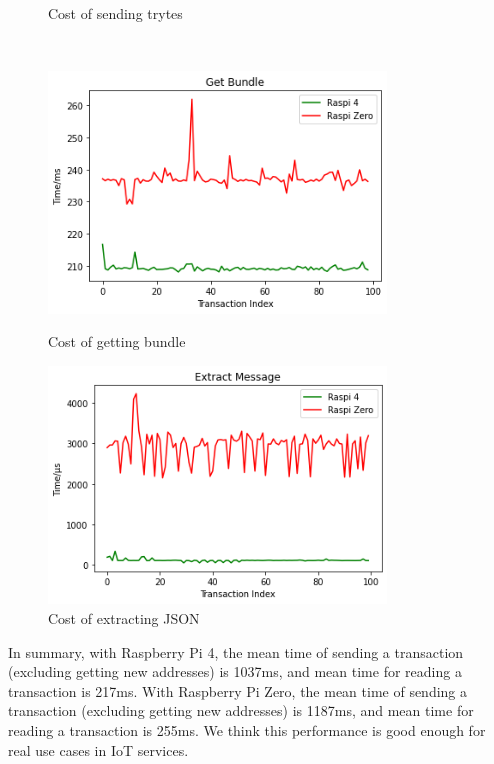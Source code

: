 \begin{figure}[t]
\begin{minipage}[t]{0.45\linewidth}
    \caption{Cost of sending trytes}
    \label{fig:cost_sending_trytes}
\end{minipage}		
\\ [1ex]
\begin{minipage}[t]{0.45\linewidth}
    \centering
    \includegraphics[width=0.8\textwidth]{figs/get_bundle_0.png}
    \caption{Cost of getting bundle}
    \label{fig:cost_getting_bundle}
    \end{minipage}
    \hfill
\begin{minipage}[t]{0.45\linewidth}
    \centering
    \includegraphics[width=0.8\textwidth]{figs/extract_message_0.png}
    \caption{Cost of extracting JSON}
    \label{fig:cost_extracting_json}
\end{minipage}
\end{figure}

In summary, with Raspberry Pi 4, the mean time of sending a transaction (excluding getting new addresses) is 1037ms, and mean time for reading a transaction is 217ms. 
With Raspberry Pi Zero, the mean time of sending a transaction (excluding getting new addresses) is 1187ms, and mean time for reading a transaction is 255ms. 
We think this performance is good enough for real use cases in IoT services.

